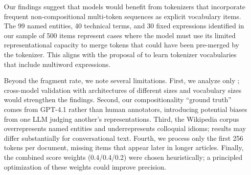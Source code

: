 Our findings suggest that models would benefit from tokenizers that incorporate frequent non-compositional multi-token sequences as explicit vocabulary items.
The 99 named entities, 40 technical terms, and 30 fixed expressions identified in our sample of 500 items represent cases where the model must use its limited representational capacity to merge tokens that could have been pre-merged by the tokenizer.
This aligns with the proposal of \citet{yang2024rethinking} to learn tokenizer vocabularies that include multiword expressions.

Beyond the fragment rate, we note several limitations.
First, we analyze only \mistral; cross-model validation with architectures of different sizes and vocabulary sizes would strengthen the findings.
Second, our compositionality ``ground truth'' comes from GPT-4.1 rather than human annotators, introducing potential biases from one LLM judging another's representations.
Third, the Wikipedia corpus overrepresents named entities and underrepresents colloquial idioms; results may differ substantially for conversational text.
Fourth, we process only the first 256 tokens per document, missing items that appear later in longer articles.
Finally, the combined score weights (0.4/0.4/0.2) were chosen heuristically; a principled optimization of these weights could improve precision.
